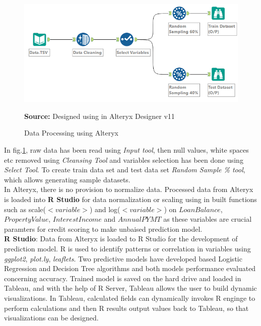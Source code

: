 \begin{center}
\begin{figure}[ht]
\includegraphics[width=\textwidth]{dataprocess.png}
\centering
\caption{Data Processing using Alteryx}{\textbf{Source:} Designed using in Alteryx Designer v11}
\label{fig:dataprocessing}
\end{figure}
\end{center}

In fig.\ref{fig:dataprocessing}, raw data has been read using \emph{Input tool}, then null values, white spaces etc removed using \emph{Cleansing Tool} and variables selection has been done using \emph{Select Tool}. To create train data set and test data set \emph{Random Sample \% tool}, which allows generating sample datasets.\\

In Alteryx, there is no provision to normalize data. Processed data from Alteryx is loaded into \textbf{R Studio} for data normalization or scaling using in built functions such as scale($<variable>$) and log($<variable>$) on $LoanBalance$, $PropertyValue$, $InterestIncome$ and $AnnualPYMT$ as these variables are crucial paramters for credit scoring to make unbaised prediction model.\\

\textbf{R Studio}: Data from Alteryx is loaded to R Studio for the development of prediction model. R is used to identify patterns or correlation in variables using \emph{ggplot2}, \emph{plot.ly}, \emph{leaflets}. Two predictive models have developed based Logistic Regression and Decision Tree algorithms and both models performance evaluated concerning accuracy. Trained model is saved on the hard drive and loaded in Tableau, and with the help of R Server, Tableau allows the user to build dynamic visualizations. In Tableau, calculated fields can dynamically invokes R enginge to perform calculations and then R results output values back to Tableau, so that visualizations can be designed.\\

